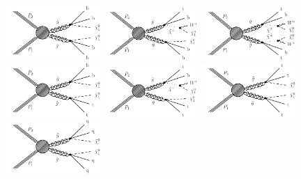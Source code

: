 \begin{figure}[thb!]
\centering
\includegraphics[width=0.32\textwidth]{figs/theory/T1bbbb.pdf}
\includegraphics[width=0.32\textwidth]{figs/theory/T1tbbb.pdf}
\includegraphics[width=0.32\textwidth]{figs/theory/T1ttbb.pdf} \\
\includegraphics[width=0.32\textwidth]{figs/theory/T1tbtb.pdf} 
\includegraphics[width=0.32\textwidth]{figs/theory/T1tttb.pdf}
\includegraphics[width=0.32\textwidth]{figs/theory/T1tttt.pdf} \\
\includegraphics[width=0.32\textwidth]{figs/theory/T1qqqq.pdf} \\

\end{figure}
